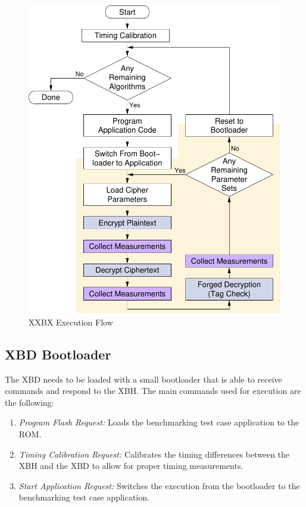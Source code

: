 \documentclass[10pt]{article}
\begin{document}
\begin{figure}[ht]
    \centering
    \includegraphics[scale=0.6]{../figures/xxbx_flow.pdf}
    \caption{XXBX Execution Flow}
    \label{fig:xxbx_flow}
\end{figure}


\subsection{XBD Bootloader}
The XBD needs to be loaded with a small bootloader that is able to receive commands 
and respond to the XBH. The main commands used for execution are the following:

\begin{enumerate}
  \item\emph{Program Flash Request: }
     Loads the benchmarking test case application to the ROM.
  \item\emph{Timing Calibration Request: }
     Calibrates the timing differences between the XBH and the XBD to allow for proper 
     timing measurements.
  \item\emph{Start Application Request: }
     Switches the execution from the bootloader to the benchmarking test case application.
\end{enumerate}
\end{document}
